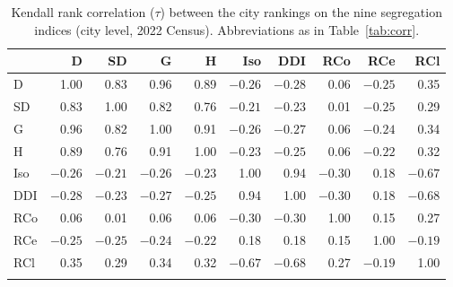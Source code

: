 \begin{table}[h]
\caption{Kendall rank correlation ($\tau$) between the city rankings on the nine segregation indices (city level, 2022 Census). Abbreviations as in Table~\ref{tab:corr}.}\label{tab:rankcorr}%
\footnotesize
\setlength{\tabcolsep}{4.5pt}
\begin{tabular}{@{}lrrrrrrrrr@{}}
\toprule
 & D & SD & G & H & Iso & DDI & RCo & RCe & RCl \\
\midrule
D   & 1.00 & 0.83 & 0.96 & 0.89 & $-0.26$ & $-0.28$ & 0.06 & $-0.25$ & 0.35 \\
SD  & 0.83 & 1.00 & 0.82 & 0.76 & $-0.21$ & $-0.23$ & 0.01 & $-0.25$ & 0.29 \\
G   & 0.96 & 0.82 & 1.00 & 0.91 & $-0.26$ & $-0.27$ & 0.06 & $-0.24$ & 0.34 \\
H   & 0.89 & 0.76 & 0.91 & 1.00 & $-0.23$ & $-0.25$ & 0.06 & $-0.22$ & 0.32 \\
Iso & $-0.26$ & $-0.21$ & $-0.26$ & $-0.23$ & 1.00 & 0.94 & $-0.30$ & 0.18 & $-0.67$ \\
DDI & $-0.28$ & $-0.23$ & $-0.27$ & $-0.25$ & 0.94 & 1.00 & $-0.30$ & 0.18 & $-0.68$ \\
RCo & 0.06 & 0.01 & 0.06 & 0.06 & $-0.30$ & $-0.30$ & 1.00 & 0.15 & 0.27 \\
RCe & $-0.25$ & $-0.25$ & $-0.24$ & $-0.22$ & 0.18 & 0.18 & 0.15 & 1.00 & $-0.19$ \\
RCl & 0.35 & 0.29 & 0.34 & 0.32 & $-0.67$ & $-0.68$ & 0.27 & $-0.19$ & 1.00 \\
\botrule
\end{tabular}
\end{table}
